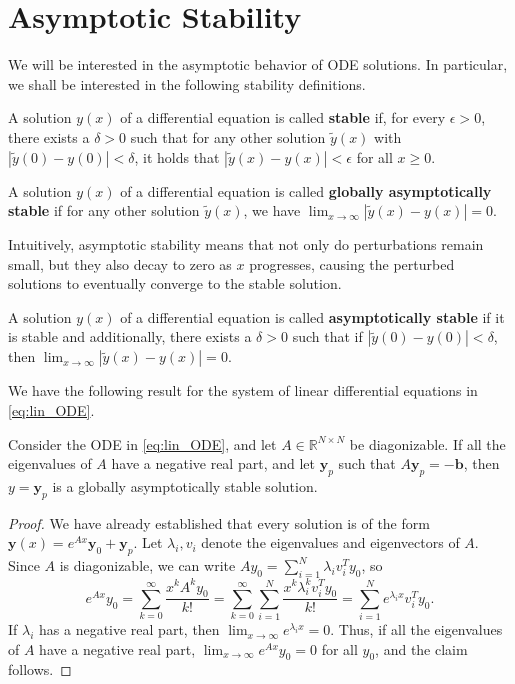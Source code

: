 \section{Asymptotic Stability}

We will be interested in the asymptotic behavior of ODE solutions. In particular, we shall be interested in the following stability definitions.

\begin{definition}[Stability]
A solution \( y(x) \) of a differential equation is called \textbf{stable} if, for every \( \epsilon > 0 \), there exists a \( \delta > 0 \) such that for any other solution \( \tilde{y}(x) \) with \( |\tilde{y}(0) - y(0)| < \delta \), it holds that \( |\tilde{y}(x) - y(x)| < \epsilon \) for all \( x \geq 0 \).    
\end{definition}
\begin{definition}
A solution \( y(x) \) of a differential equation is called \textbf{globally asymptotically stable} if for any other solution \( \tilde{y}(x) \), we have  \( \lim_{x \to \infty} |\tilde{y}(x) - y(x)| = 0 \).
\end{definition}

Intuitively, asymptotic stability means that not only do perturbations remain small, but they also decay to zero as $x$ progresses, causing the perturbed solutions to eventually converge to the stable solution. 

\begin{definition}
A solution \( y(x) \) of a differential equation is called \textbf{asymptotically stable} if it is stable and additionally, there exists a \( \delta > 0 \) such that if \( |\tilde{y}(0) - y(0)| < \delta \), then \( \lim_{x \to \infty} |\tilde{y}(x) - y(x)| = 0 \).
\end{definition}

We have the following result for the system of linear differential equations in \eqref{eq:lin_ODE}.

\begin{theorem}
Consider the ODE in \eqref{eq:lin_ODE}, and let $A\in \mathbb{R}^{N \times N}$ be diagonizable. If all the eigenvalues of $A$ have a negative real part, and let $\mathbf{y}_p$ such that $A\mathbf{y}_p = -\mathbf{b}$, then $y = \mathbf{y}_p$ is a globally asymptotically stable solution.
\end{theorem}

\begin{proof}
    We have already established that every solution is of the form $ \mathbf{y}(x) = e^{Ax} \mathbf{y}_0 + \mathbf{y}_p$. Let $\lambda_i, v_i$ denote the eigenvalues and eigenvectors of $A$. Since $A$ is diagonizable, we can write $A y_0 = \sum_{i=1}^N \lambda_i v_i^T y_0$, so
    \[
e^{Ax}y_0 = \sum_{k=0}^{\infty} \frac{x^k A^k y_0}{k!} = \sum_{k=0}^{\infty}\sum_{i=1}^N \frac{x^k \lambda_i^k v_i^T y_0}{k!} = \sum_{i=1}^N e^{\lambda_i x}v_i^T y_0.
\]
If $\lambda_i$ has a negative real part, then $\lim_{x \to \infty} e^{\lambda_i x} = 0$. Thus, if all the eigenvalues of $A$ have a negative real part, $\lim_{x \to \infty} e^{Ax}y_0 = 0$ for all $y_0$, and the claim follows.
\end{proof}

